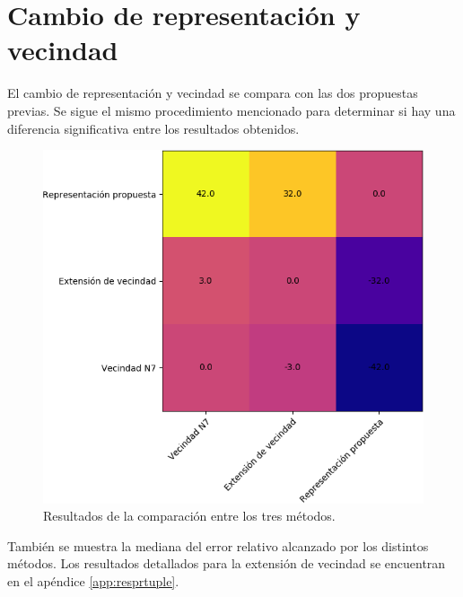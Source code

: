 \section{Cambio de representación y vecindad}
El cambio de representación y vecindad se compara con las dos propuestas previas. Se sigue el mismo procedimiento mencionado para determinar si hay una diferencia significativa entre los resultados obtenidos.
\begin{figure}[H]
    \centering
    \includegraphics[scale=.7]{Imagenes/prn7n8comp.png}
    \caption{Resultados de la comparación entre los tres métodos.}
\end{figure}
También se muestra la mediana del error relativo alcanzado por los distintos métodos. Los resultados detallados para la extensión de vecindad se encuentran en el apéndice \ref{app:resprtuple}.

